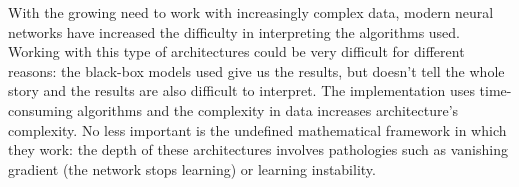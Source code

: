 With the growing need to work with increasingly complex data, modern neural networks have increased the difficulty in interpreting the algorithms used. 
Working with this type of architectures could be very difficult for different reasons: the black-box models used give us the results, but doesn't tell 
the whole story and the results are also difficult to interpret. The implementation uses time-consuming algorithms and the complexity in data increases 
architecture's complexity. No less important is the undefined mathematical framework in which they work: the depth of these architectures involves 
pathologies such as vanishing gradient (the network stops learning) or learning instability.